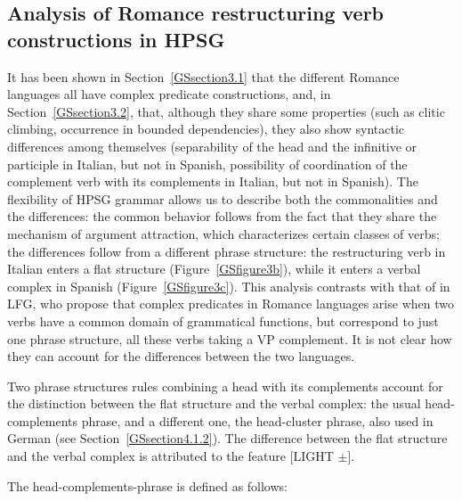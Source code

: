 \documentclass[output=paper
                ,modfonts
                ,nonflat
	        ,collection
	        ,collectionchapter
	        ,collectiontoclongg
 	        ,biblatex
                ,babelshorthands
                ,newtxmath
                ,draftmode
                ,colorlinks, citecolor=brown
]{./langsci/langscibook}
\begin{document}
{\subsection{Analysis of Romance restructuring verb constructions in HPSG} \label{GSsection3.3}
\label{sec-romance-complex-predicates}

It has been shown in Section~\ref{GSsection3.1} that the different Romance languages all have complex predicate constructions, and, in Section~\ref{GSsection3.2}, that, although they share some properties (such as clitic climbing, occurrence in bounded dependencies), they also show syntactic differences among themselves (separability of the head and the infinitive or participle in Italian, but not in Spanish, possibility of coordination of the complement verb with its complements in Italian, but not in Spanish). The flexibility of HPSG grammar allows us to describe both the commonalities and the differences: the common behavior follows from the fact that they share the mechanism of argument attraction, which characterizes certain classes of verbs; the differences follow from a different phrase structure: the restructuring verb in Italian enters a flat structure (Figure~\ref{GSfigure3b}), while it enters a verbal complex in Spanish (Figure~\ref{GSfigure3c}). This analysis contrasts with that of \cite{andrews1999complex} in LFG, who propose that complex predicates in Romance languages arise when two verbs have a common domain of grammatical functions, but correspond to just one phrase structure, all these verbs taking a VP complement. It is not clear how they can account for the differences between the two languages.

Two phrase structures rules combining a head with its complements account for the distinction between the flat structure and the verbal complex: the usual head-complements phrase, and a different one, the head-cluster phrase, also used in German (see Section~\ref{GSsection4.1.2}). The difference between the flat structure and the verbal complex is attributed to the feature [LIGHT $\pm$]. 

The head-complements-phrase is defined as follows:

\begin{exe}
\end{exe}


}
\end{document}
